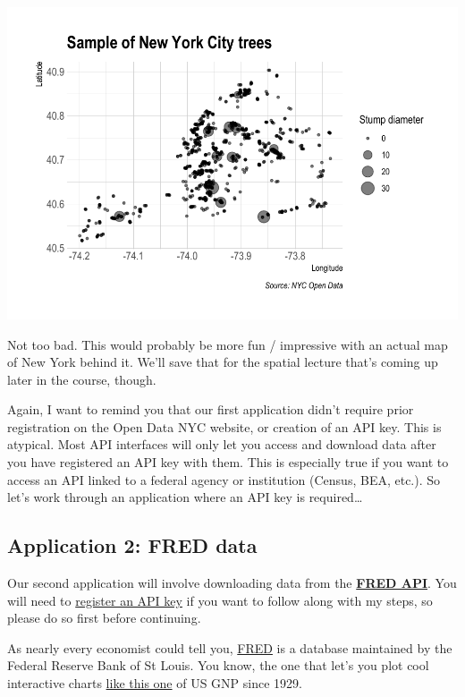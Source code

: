 \documentclass[
]{article}
\begin{document}
\includegraphics{07-web-apis_files/figure-latex/nyc3-1.pdf}

Not too bad. This would probably be more fun / impressive with an actual
map of New York behind it. We'll save that for the spatial lecture
that's coming up later in the course, though.

Again, I want to remind you that our first application didn't require
prior registration on the Open Data NYC website, or creation of an API
key. This is atypical. Most API interfaces will only let you access and
download data after you have registered an API key with them. This is
especially true if you want to access an API linked to a federal agency
or institution (Census, BEA, etc.). So let's work through an application
where an API key is required\ldots{}

\hypertarget{application-2-fred-data}{%
\subsection{Application 2: FRED data}\label{application-2-fred-data}}

Our second application will involve downloading data from the
\href{https://research.stlouisfed.org/docs/api/fred/}{\textbf{FRED
API}}. You will need to
\href{https://research.stlouisfed.org/useraccount/apikey}{register an
API key} if you want to follow along with my steps, so please do so
first before continuing.

As nearly every economist could tell you,
\href{https://fred.stlouisfed.org/}{FRED} is a database maintained by
the Federal Reserve Bank of St Louis. You know, the one that let's you
plot cool interactive charts
\href{https://fred.stlouisfed.org/series/GNPCA\#0}{like this one} of US
GNP since 1929.
\end{document}
